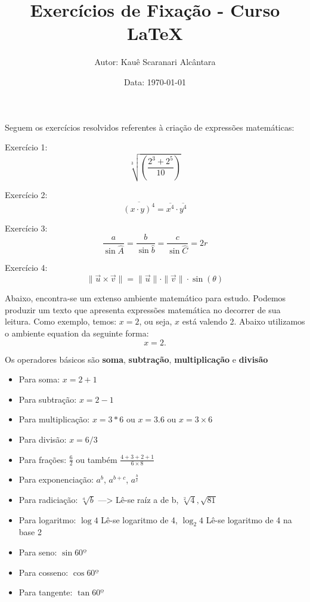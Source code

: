 \documentclass[a4paper, 12pt]{article}
\title{{\LARGE \textbf{Exercícios de Fixação - Curso LaTeX}}}
\author{Autor: Kauê Scaranari Alcântara}
\date{Data: \today}
\begin{document}
\maketitle
Seguem os exercícios resolvidos referentes à criação de expressões matemáticas:

Exercício 1:
\begin{equation}
\sqrt[3]{\left(\frac{2^{3} + 2^{5}}{10}\right)}
\end{equation}

Exercício 2:
\begin{equation}
\overline{(x \cdot y)^{4}} = \overline{x^{4}} \cdot \overline{y^{4}}
\end{equation}

Exercício 3:
\begin{equation}
\frac{a}{\sin\widehat{A}} = \frac{b}{\sin\widehat{b}} = \frac{c}{\sin\widehat{C}} = 2r
\end{equation}

Exercício 4:
\begin{equation}
\|\vec{u} \times \vec{v}\| = \|\vec{u}\| \cdot \|\vec{v}\| \cdot \sin\left(\theta\right)
\end{equation}

Abaixo, encontra-se um extenso ambiente matemático para estudo.
Podemos produzir um texto que apresenta expressões matemática no decorrer de sua leitura. Como exemplo, temos: $x = 2$, ou seja, $x$ está valendo 2.
Abaixo utilizamos o ambiente equation da seguinte forma:
\begin{equation}
x = 2.
\end{equation}

Os operadores básicos são \textbf{soma}, \textbf{subtração}, \textbf{multiplicação} e \textbf{divisão}
\begin{itemize}
\item Para soma: $x = 2 + 1$
\item Para subtração: $x = 2 - 1$
\item Para multiplicação: $x = 3*6$ ou $x = 3.6$ ou $x = 3 \times 6$
\item Para divisão: $x = 6/3$
\item Para frações: $\frac{6}{2}$ ou também $\frac{4+3+2+1}{6\times8}$
\item Para exponenciação: $a^b$, $a^{b+c}$, $a^{\frac{b}{c}}$
\item Para radiciação: $\sqrt[a]{b}$ ---> Lê-se raíz a de b, $\sqrt[2]{4}, \sqrt{81}$
\item Para logaritmo: $\log 4$ Lê-se logaritmo de 4, $\log_{2}4$ Lê-se logaritmo de 4 na base 2
\item Para seno: $\sin 60º$
\item Para cosseno: $\cos 60º$
\item Para tangente: $\tan 60º$
\end{itemize}
\end{document}

